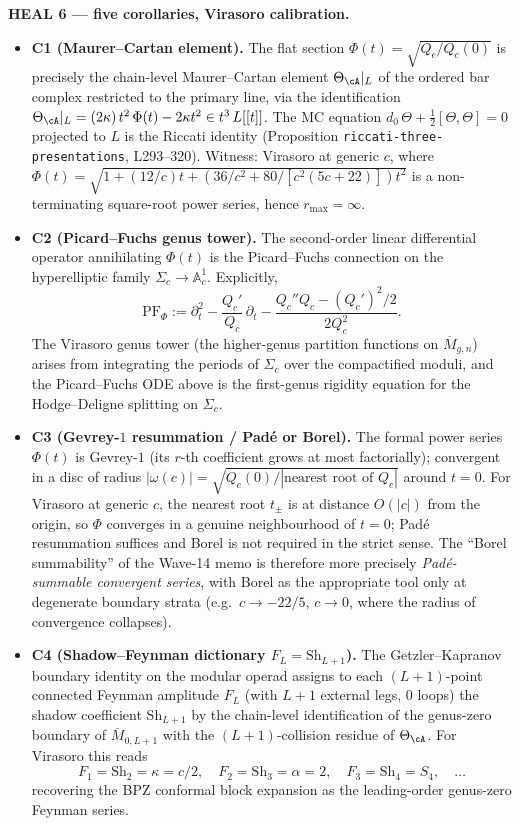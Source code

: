 \textbf{HEAL 6 --- five corollaries, Virasoro calibration.}

\begin{itemize}
\item \textbf{C1 (Maurer--Cartan element).} The flat section
$\Phi(t) = \sqrt{Q_c/Q_c(0)}$ is precisely the chain-level
Maurer--Cartan element $\Theta_\cA|_L$ of the ordered bar complex
restricted to the primary line, via the identification
$\Theta_\cA|_L = (2\kappa)\,t^2\,\Phi(t) - 2\kappa t^2 \in
t^3\,L[[t]]$. The MC equation $d_0\,\Theta + \tfrac12[\Theta,\Theta]
= 0$ projected to $L$ is the Riccati identity (Proposition
\texttt{riccati-three-presentations}, L293--320). Witness: Virasoro
at generic $c$, where $\Phi(t) = \sqrt{1 + (12/c)t + (36/c^2 +
80/[c^2(5c+22)])t^2}$ is a non-terminating square-root power series,
hence $r_{\max} = \infty$.

\item \textbf{C2 (Picard--Fuchs genus tower).} The second-order
linear differential operator annihilating $\Phi(t)$ is the
Picard--Fuchs connection on the hyperelliptic family $\Sigma_c \to
\mathbb A^1_c$. Explicitly,
\[
  \mathrm{PF}_\Phi := \partial_t^2 - \frac{Q_c'}{Q_c}\,\partial_t
                  - \frac{Q_c'' Q_c - (Q_c')^2/2}{2 Q_c^2}.
\]
The Virasoro genus tower (the higher-genus partition functions on
$\overline M_{g,n}$) arises from integrating the periods of $\Sigma_c$
over the compactified moduli, and the Picard--Fuchs ODE above is the
first-genus rigidity equation for the Hodge--Deligne splitting on
$\Sigma_c$.

\item \textbf{C3 (Gevrey-$1$ resummation / Pad\'e or Borel).} The
formal power series $\Phi(t)$ is Gevrey-$1$ (its $r$-th coefficient
grows at most factorially); convergent in a disc of radius
$|\omega(c)| = \sqrt{Q_c(0)/|\text{nearest root of }Q_c|}$ around
$t = 0$. For Virasoro at generic $c$, the nearest root $t_\pm$ is at
distance $O(|c|)$ from the origin, so $\Phi$ converges in a genuine
neighbourhood of $t=0$; Pad\'e resummation suffices and Borel is not
required in the strict sense. The ``Borel summability'' of the
Wave-14 memo is therefore more precisely \emph{Pad\'e-summable
convergent series}, with Borel as the appropriate tool only at
degenerate boundary strata (e.g.\ $c \to -22/5$, $c \to 0$, where
the radius of convergence collapses).

\item \textbf{C4 (Shadow--Feynman dictionary $F_L = \mathrm{Sh}_{L+1}$).}
The Getzler--Kapranov boundary identity on the modular operad
assigns to each $(L+1)$-point connected Feynman amplitude $F_L$ (with
$L+1$ external legs, $0$ loops) the shadow coefficient
$\mathrm{Sh}_{L+1}$ by the chain-level identification of the
genus-zero boundary of $\overline M_{0, L+1}$ with the $(L+1)$-collision
residue of $\Theta_\cA$. For Virasoro this reads
\[
  F_1 = \mathrm{Sh}_2 = \kappa = c/2,\quad
  F_2 = \mathrm{Sh}_3 = \alpha = 2,\quad
  F_3 = \mathrm{Sh}_4 = S_4,\quad \ldots
\]
recovering the BPZ conformal block expansion as the leading-order
genus-zero Feynman series.


\end{itemize}
